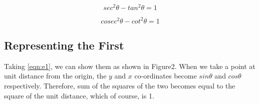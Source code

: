 \documentclass[14pt]{article}
\begin{document}
\begin{equation}
	sec^2\theta - tan^2\theta = 1 
	\label{eqn:e2}
\end{equation}

\begin{equation}
	cosec^2\theta - cot^2\theta = 1
	\label{eqn:e3}
\end{equation}

\subsection{Representing the First}
Taking \ref{eqn:e1}, we can show them as shown in Figure2. When we take a point at
unit distance from the origin, the $y$ and $x$ co-ordinates become $sin\theta$ and $cos\theta$
respectively. Therefore, sum of the squares of the two becomes equal to the
square of the unit distance, which of course, is 1.
\end{document}
